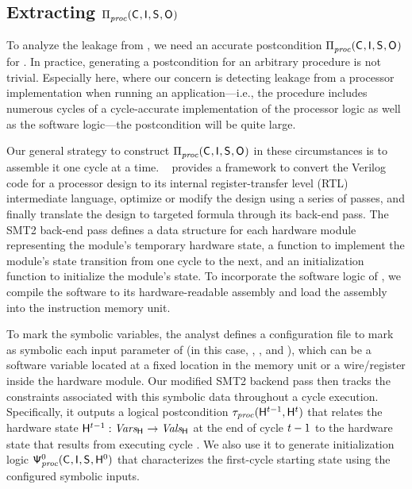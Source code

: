 \subsection{Extracting $\Pi_{\mathit{proc}}^{}(\mathsf{C}_{}, \mathsf{I}_{},
\mathsf{S}_{}, \mathsf{O}_{})$} 
\label{dinome:sec:impl:logic}

To analyze the leakage from \proc, we need an accurate postcondition
$\Pi_{\mathit{proc}}^{}(\mathsf{C}_{}, \mathsf{I}_{}, \mathsf{S}_{}, \mathsf{O}_{})$ for
\proc. In practice, generating a postcondition for an arbitrary
procedure is not trivial.  Especially here, where our concern is
detecting leakage from a processor implementation when running an
application---i.e., the procedure \proc includes numerous cycles of a
cycle-accurate implementation of the processor logic as well as the
software logic---the postcondition will be quite large.

Our general strategy to construct $\Pi_{\mathit{proc}}^{}(\mathsf{C}_{},
\mathsf{I}_{}, \mathsf{S}_{}, \mathsf{O}_{})$ in these circumstances is to assemble
it one cycle at a time. \yosys~\cite{Yosys} provides a framework to
convert the Verilog code for a processor design to its internal
register-transfer level (RTL) intermediate language, optimize or
modify the design using a series of passes, and finally translate the
design to targeted formula through its back-end pass.  The SMT2
back-end pass defines a data structure for each hardware module
representing the module's temporary hardware state, a function to
implement the module's state transition from one cycle to the
next, and an initialization function to initialize the module's state.
To incorporate the software logic of \proc, we compile the software to
its hardware-readable assembly and load the assembly into the
instruction memory unit.

To mark the symbolic variables, the analyst defines a configuration
file to mark as symbolic each input parameter of \proc (in this case,
\SecVar, \AIIVar, and \ACIVar), which can be a software variable
located at a fixed location in the memory unit or a wire/register
inside the hardware module. Our modified \yosys SMT2 backend pass then
tracks the constraints associated with this symbolic data throughout a
cycle execution.  Specifically, it outputs a logical postcondition
$\tau_{\mathit{proc}}(\mathsf{H}_{}^{t-1}, \mathsf{H}_{}^{t})$ that
relates the hardware state $\mathsf{H}_{}^{t-1} : \mathit{Vars_{\mathsf{H}_{}^{}}} \rightarrow
\mathit{Vals_{\mathsf{H}_{}^{}}}$ at the end of cycle $t-1$ to the hardware state
\HwFn{}{\cycle} that results from executing cycle \cycle.  We also use
it to generate initialization logic
$\mathsf{\Psi}_{\mathit{proc}}^{0}(\mathsf{C}_{}, \mathsf{I}_{}, \mathsf{S}_{}, \mathsf{H}_{}^{0})$
that characterizes the first-cycle starting state  using the
configured symbolic inputs.

